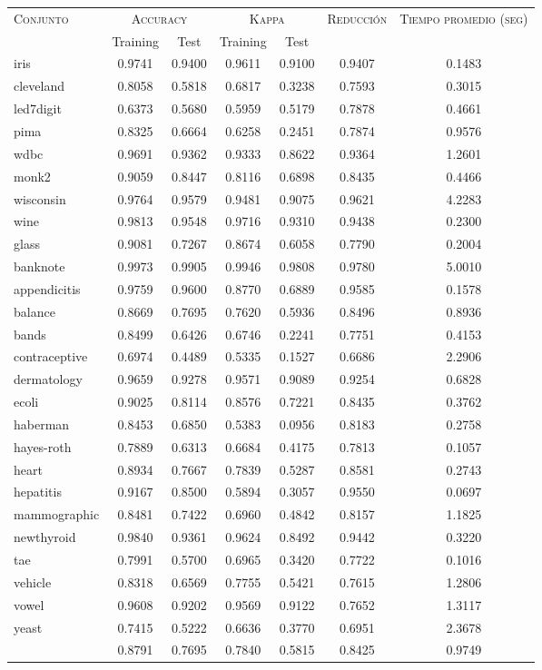 \begin{table}[]
\centering
\begin{tabular}{l c c c c c c}
\hline
\multirow{2}{*}{\textsc{Conjunto}}
	& \multicolumn{2}{c}{\textsc{Accuracy}}
	& \multicolumn{2}{c}{\textsc{Kappa}}
	& \textsc{Reducción}
	& \textsc{Tiempo promedio (seg)} \\
	& Training & Test
	& Training & Test \\ 
\hline
\hline

iris & 0.9741 & 0.9400 & 0.9611 & 0.9100 & 0.9407 & 0.1483 \\
cleveland & 0.8058 & 0.5818 & 0.6817 & 0.3238 & 0.7593 & 0.3015 \\
led7digit & 0.6373 & 0.5680 & 0.5959 & 0.5179 & 0.7878 & 0.4661 \\
pima & 0.8325 & 0.6664 & 0.6258 & 0.2451 & 0.7874 & 0.9576 \\
wdbc & 0.9691 & 0.9362 & 0.9333 & 0.8622 & 0.9364 & 1.2601 \\
monk2 & 0.9059 & 0.8447 & 0.8116 & 0.6898 & 0.8435 & 0.4466 \\
wisconsin & 0.9764 & 0.9579 & 0.9481 & 0.9075 & 0.9621 & 4.2283 \\
wine & 0.9813 & 0.9548 & 0.9716 & 0.9310 & 0.9438 & 0.2300 \\
glass & 0.9081 & 0.7267 & 0.8674 & 0.6058 & 0.7790 & 0.2004 \\
banknote & 0.9973 & 0.9905 & 0.9946 & 0.9808 & 0.9780 & 5.0010 \\
appendicitis & 0.9759 & 0.9600 & 0.8770 & 0.6889 & 0.9585 & 0.1578 \\
balance & 0.8669 & 0.7695 & 0.7620 & 0.5936 & 0.8496 & 0.8936 \\
bands & 0.8499 & 0.6426 & 0.6746 & 0.2241 & 0.7751 & 0.4153 \\
contraceptive & 0.6974 & 0.4489 & 0.5335 & 0.1527 & 0.6686 & 2.2906 \\
dermatology & 0.9659 & 0.9278 & 0.9571 & 0.9089 & 0.9254 & 0.6828 \\
ecoli & 0.9025 & 0.8114 & 0.8576 & 0.7221 & 0.8435 & 0.3762 \\
haberman & 0.8453 & 0.6850 & 0.5383 & 0.0956 & 0.8183 & 0.2758 \\
hayes-roth & 0.7889 & 0.6313 & 0.6684 & 0.4175 & 0.7813 & 0.1057 \\
heart & 0.8934 & 0.7667 & 0.7839 & 0.5287 & 0.8581 & 0.2743 \\
hepatitis & 0.9167 & 0.8500 & 0.5894 & 0.3057 & 0.9550 & 0.0697 \\
mammographic & 0.8481 & 0.7422 & 0.6960 & 0.4842 & 0.8157 & 1.1825 \\
newthyroid & 0.9840 & 0.9361 & 0.9624 & 0.8492 & 0.9442 & 0.3220 \\
tae & 0.7991 & 0.5700 & 0.6965 & 0.3420 & 0.7722 & 0.1016 \\
vehicle & 0.8318 & 0.6569 & 0.7755 & 0.5421 & 0.7615 & 1.2806 \\
vowel & 0.9608 & 0.9202 & 0.9569 & 0.9122 & 0.7652 & 1.3117 \\
yeast & 0.7415 & 0.5222 & 0.6636 & 0.3770 & 0.6951 & 2.3678 \\
 & 0.8791 & 0.7695 & 0.7840 & 0.5815 & 0.8425 & 0.9749 \\


\end{tabular}
\end{table}
